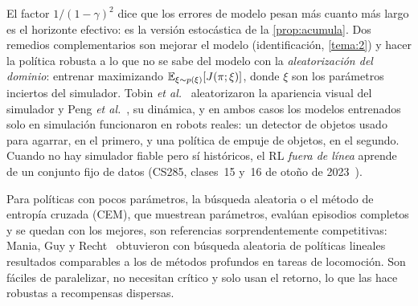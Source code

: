 El factor $1/(1-\gamma)^{2}$ dice que los errores de modelo pesan más cuanto más largo es el horizonte efectivo: es la versión estocástica de la \cref{prop:acumula}. Dos remedios complementarios son mejorar el modelo (identificación, \cref{tema:2}) y hacer la política robusta a lo que no se sabe del modelo con la \emph{aleatorización del dominio}: entrenar maximizando $\mathbb{E}_{\xi\sim p(\xi)}[J(\pi;\xi)]$, donde $\xi$ son los parámetros inciertos del simulador. Tobin \emph{et al.}~\cite{tobin} aleatorizaron la apariencia visual del simulador y Peng \emph{et al.}~\cite{peng}, su dinámica, y en ambos casos los modelos entrenados solo en simulación funcionaron en robots reales: un detector de objetos usado para agarrar, en el primero, y una política de empuje de objetos, en el segundo. Cuando no hay simulador fiable pero sí históricos, el RL \emph{fuera de línea} aprende de un conjunto fijo de datos (CS285, clases~15 y~16 de otoño de 2023~\cite{cs285}).

\begin{observacion}\label{obs:busqueda}
Para políticas con pocos parámetros, la búsqueda aleatoria o el método de entropía cruzada (CEM), que muestrean parámetros, evalúan episodios completos y se quedan con los mejores, son referencias sorprendentemente competitivas: Mania, Guy y Recht~\cite{ars} obtuvieron con búsqueda aleatoria de políticas lineales resultados comparables a los de métodos profundos en tareas de locomoción. Son fáciles de paralelizar, no necesitan crítico y solo usan el retorno, lo que las hace robustas a recompensas dispersas.
\end{observacion}

\addtocounter{definicion}{1}%

\addtocounter{definicion}{1}%

